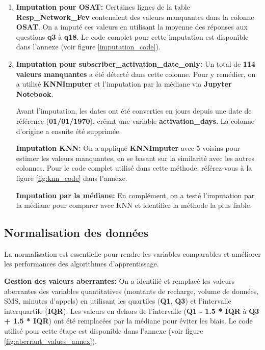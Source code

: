 \begin{enumerate}
    \item \textbf{Imputation pour OSAT:} Certaines lignes de la table \textbf{Resp\_Network\_Fev} contenaient des valeurs manquantes dans la colonne \textbf{OSAT}. On a imputé ces valeurs en utilisant la moyenne des réponses aux questions \textbf{q3} à \textbf{q18}. Le code complet pour cette imputation est disponible dans l'annexe (voir figure \ref{imputation_code}).

    \item \textbf{Imputation pour subscriber\_activation\_date\_only:} Un total de \textbf{114 valeurs manquantes} a été détecté dans cette colonne. Pour y remédier, on a utilisé \textbf{KNNImputer} et l'imputation par la médiane via \textbf{Jupyter Notebook}. 

    Avant l'imputation, les dates ont été converties en jours depuis une date de référence (\textbf{01/01/1970}), créant une variable \textbf{activation\_days}. La colonne d'origine a ensuite été supprimée.

    \textbf{Imputation KNN:} On a appliqué \textbf{KNNImputer} avec 5 voisins pour estimer les valeurs manquantes, en se basant sur la similarité avec les autres colonnes. Pour le code complet utilisé dans cette méthode, référez-vous à la figure \ref{fig:knn_code} dans l'annexe.

    \textbf{Imputation par la médiane:} En complément, on a testé l'imputation par la médiane pour comparer avec KNN et identifier la méthode la plus fiable.

\end{enumerate}

\subsection{Normalisation des données}

La normalisation est essentielle pour rendre les variables comparables et améliorer les performances des algorithmes d'apprentissage.

\textbf{\checkmark Gestion des valeurs aberrantes:}  
On a identifié et remplacé les valeurs aberrantes des variables quantitatives (montants de recharge, volume de données, SMS, minutes d'appels) en utilisant les quartiles (\textbf{Q1}, \textbf{Q3}) et l'intervalle interquartile (\textbf{IQR}). Les valeurs en dehors de l'intervalle (\textbf{Q1 - 1.5 * IQR} à \textbf{Q3 + 1.5 * IQR}) ont été remplacées par la médiane pour éviter les biais. Le code utilisé pour cette étape est disponible dans l'annexe (voir figure \ref{fig:aberrant_values_annex}).


